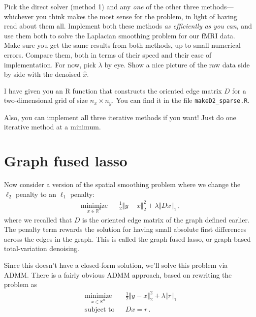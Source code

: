 \documentclass{mynotes}
\newcommand{\R}{\mathbb{R}}
\begin{document}
\begin{enumerate}[(A)]
Pick the direct solver (method 1) and any \textit{one} of the other three methods---whichever you think makes the most sense for the problem, in light of having read about them all.  Implement both these methods \textit{as efficiently as you can}, and use them both to solve the Laplacian smoothing problem for our fMRI data.  Make sure you get the same results from both methods, up to small numerical errors.  Compare them, both in terms of their speed and their ease of implementation.  For now, pick $\lambda$ by eye.  Show a nice picture of the raw data side by side with the denoised $\hat{x}$.

I have given you an R function that constructs the oriented edge matrix $D$ for a two-dimensional grid of size $n_x \times n_y$.  You can find it in the file \verb|makeD2_sparse.R|.

Also, you can implement all three iterative methods if you want!  Just do one iterative method at a minimum.

%

\section{Graph fused lasso}

Now consider a version of the spatial smoothing problem where we change the $\ell_2$ penalty to an $\ell_1$ penalty:
\begin{equation}
\begin{aligned}
& \underset{x \in \R^n}{\text{minimize}}
& & 
\frac{1}{2} \Vert y - x \Vert_2^2  + \lambda \Vert D x\Vert_1 \, ,
\end{aligned}
\end{equation}
where we recalled that $D$ is the oriented edge matrix of the graph defined earlier.  The penalty term rewards the solution for having small absolute first differences across the edges in the graph.  This is called the graph fused lasso, or graph-based total-variation denoising.

Since this doesn't have a closed-form solution, we'll solve this problem via ADMM.  There is a fairly obvious ADMM approach, based on rewriting the problem as
\begin{equation}
\begin{aligned}
& \underset{x \in \R^n}{\text{minimize}}
& & 
\frac{1}{2} \Vert y - x \Vert_2^2  + \lambda \Vert r \Vert_1 \\
& \text{subject to}
& & Dx = r \, .
\end{aligned}
\end{equation}


\end{enumerate}
\end{document}
